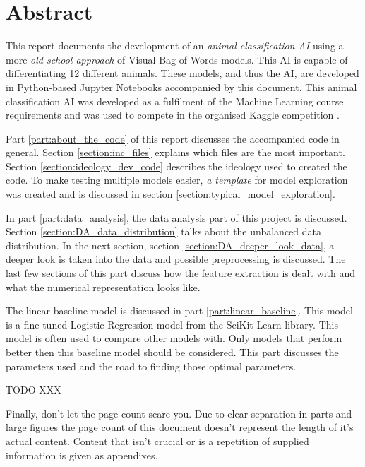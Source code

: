 \chapter*{Abstract}

This report documents the development of an \textit{animal classification AI} using a more \textit{old-school approach} of Visual-Bag-of-Words models.
This AI is capable of differentiating 12 different animals.
These models, and thus the AI, are developed in Python-based Jupyter Notebooks accompanied by this document.
This animal classification AI was developed as a fulfilment of the Machine Learning course requirements and was used to compete in the organised Kaggle competition \citep{kaggle_competition}.

Part \ref{part:about_the_code} of this report discusses the accompanied code in general.
Section \ref{section:inc_files} explains which files are the most important. 
Section \ref{section:ideology_dev_code} describes the ideology used to created the code. 
To make testing multiple models easier, \textit{a template} for model exploration was created and is discussed in section \ref{section:typical_model_exploration}.

In part \ref{part:data_analysis}, the data analysis part of this project is discussed.
Section \ref{section:DA_data_distribution} talks about the unbalanced data distribution.
In the next section, section \ref{section:DA_deeper_look_data}, a deeper look is taken into the data and possible preprocessing is discussed.
The last few sections of this part discuss how the feature extraction is dealt with and what the numerical representation looks like.

The linear baseline model is discussed in part \ref{part:linear_baseline}.
This model is a fine-tuned Logistic Regression model from the SciKit Learn library.
This model is often used to compare other models with.
Only models that perform better then this baseline model should be considered.
This part discusses the parameters used and the road to finding those optimal parameters.

TODO XXX

Finally, don't let the page count scare you.
Due to clear separation in parts and large figures the page count of this document doesn't represent the length of it's actual content.
Content that isn't crucial or is a repetition of supplied information is given as appendixes.